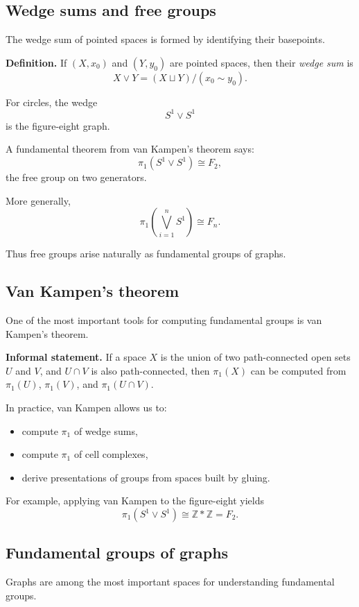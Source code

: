 \documentclass[12pt,a4paper]{article}
\theoremstyle{notespace}
\begin{document}
\subsection{Wedge sums and free groups}

The wedge sum of pointed spaces is formed by identifying their basepoints.

\textbf{Definition.}
If \((X,x_0)\) and \((Y,y_0)\) are pointed spaces, then their \emph{wedge sum} is
\[
X\vee Y=(X\sqcup Y)/(x_0\sim y_0).
\]

For circles, the wedge
\[
S^1\vee S^1
\]
is the figure-eight graph.

A fundamental theorem from van Kampen's theorem says:
\[
\pi_1(S^1\vee S^1)\cong F_2,
\]
the free group on two generators.

More generally,
\[
\pi_1\!\left(\bigvee_{i=1}^n S^1\right)\cong F_n.
\]

Thus free groups arise naturally as fundamental groups of graphs.

\subsection{Van Kampen's theorem}

One of the most important tools for computing fundamental groups is van Kampen's theorem.

\textbf{Informal statement.}
If a space \(X\) is the union of two path-connected open sets \(U\) and \(V\), and \(U\cap V\) is also path-connected, then \(\pi_1(X)\) can be computed from \(\pi_1(U)\), \(\pi_1(V)\), and \(\pi_1(U\cap V)\).

In practice, van Kampen allows us to:
\begin{itemize}
	\item compute \(\pi_1\) of wedge sums,
	\item compute \(\pi_1\) of cell complexes,
	\item derive presentations of groups from spaces built by gluing.
\end{itemize}

For example, applying van Kampen to the figure-eight yields
\[
\pi_1(S^1\vee S^1)\cong \mathbb Z * \mathbb Z = F_2.
\]

\subsection{Fundamental groups of graphs}

Graphs are among the most important spaces for understanding fundamental groups.
\end{document}

